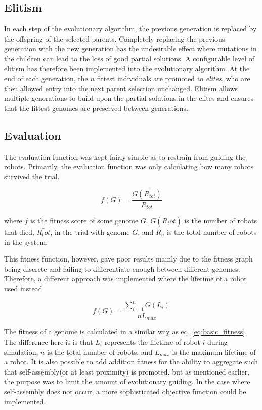 \subsection{Elitism}
In each step of the evolutionary algorithm, the previous generation is replaced by the offspring of the selected parents.
Completely replacing the previous generation with the new generation has the undesirable effect where mutations in the children can lead to the loss of good partial solutions.
A configurable level of elitism has therefore been implemented into the evolutionary algorithm.
At the end of each generation, the $n$ fittest individuals are promoted to \emph{elites}, who are then allowed entry into the next parent selection unchanged.
Elitism allows multiple generations to build upon the partial solutions in the elites and ensures that the fittest genomes are preserved between generations.

\subsection{Evaluation}
\label{sec:evaluation}
The evaluation function was kept fairly simple as to restrain from guiding the robots.
Primarily, the evaluation function was only calculating how many robots survived the trial.

\begin{equation}
\label{eq:basic_fitness}
f(G) = \frac{G(\bar{R_{tot}})}{R_{tot}}
\end{equation}

where $f$ is the fitness score of some genome $G$.
$G(\bar{R_tot})$ is the number of robots that died, $\bar{R_tot}$, in the trial with genome $G$, and $R_n$ is the total number of robots in the system.

This fitness function, however, gave poor results mainly due to the fitness graph being discrete and failing to differentiate enough between different genomes.
Therefore, a different approach was implemented where the lifetime of a robot used instead.

\begin{equation}
f(G) = \frac{\sum_{i=1}^n G(L_i)}{nL_{max}}
\end{equation}

The fitness of a genome is calculated in a similar way as eq. \ref{eq:basic_fitness}.
The difference here is is that $L_i$ represents the lifetime of robot $i$ during simulation, $n$ is the total number of robots, and $L_{max}$ is the maximum lifetime of a robot.
It is also possible to add addition fitness for the ability to aggregate such that self-assembly(or at least proximity) is promoted, but as mentioned earlier, the purpose was to limit the amount of evolutionary guiding.
In the case where self-assembly does not occur, a more sophisticated objective function could be implemented.
		
